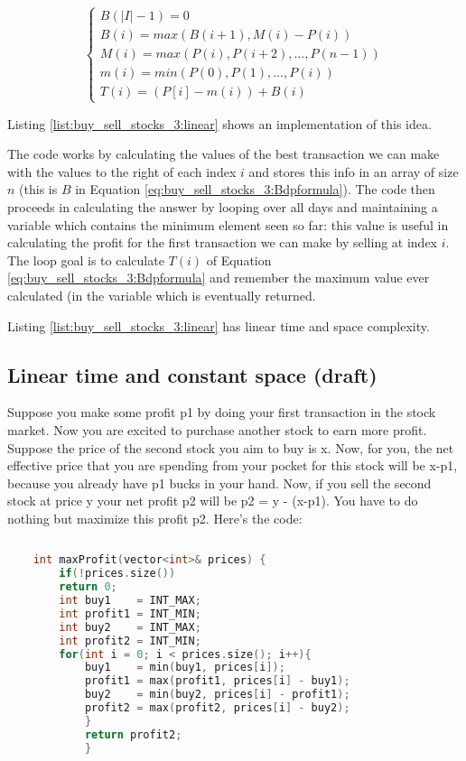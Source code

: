 \begin{equation}
    \begin{cases}
        B(|I|-1) = 0 \\
        B(i) = max(B(i+1), M(i)-P(i)) \\
		M(i) = max(P(i), P(i+2), \ldots, P(n-1)) \\
		m(i) = min(P(0), P(1), \ldots, P(i)) \\
		T(i) = (P[i]-m(i)) + B(i)
     \end{cases}
    \label{eq:buy_sell_stocks_3:Bdpformula}
\end{equation}

Listing \ref{list:buy_sell_stocks_3:linear} shows an implementation of this idea.



The code works by calculating the values of the best transaction we can make with the values to the right of each index $i$ and stores this info in an array of size $n$ (this is $B$ in Equation \ref{eq:buy_sell_stocks_3:Bdpformula}).
The code then proceeds in calculating the answer by looping over all days and maintaining a variable  which contains the minimum element seen so far: this value is useful in calculating the profit for the first transaction we can make by selling at index $i$.
The loop goal is to calculate $T(i)$ of Equation \ref{eq:buy_sell_stocks_3:Bdpformula} and remember the maximum value ever calculated (in the variable which is eventually returned.

Listing \ref{list:buy_sell_stocks_3:linear} has linear time and space complexity.


\subsection{Linear time and constant space (draft)}
Suppose you make some profit p1 by doing your first transaction in the stock market. Now you are excited to purchase another stock to earn more profit. Suppose the price of the second stock you aim to buy is x. Now, for you, the net effective price that you are spending from your pocket for this stock will be x-p1, because you already have p1 bucks in your hand. Now, if you sell the second stock at price y your net profit p2 will be p2 = y - (x-p1). You have to do nothing but maximize this profit p2. Here's the code:
\begin{lstlisting}[language=c++,numbers=none, caption={}]
	      
	int maxProfit(vector<int>& prices) {
		if(!prices.size())
		return 0;
        int buy1    = INT_MAX;
        int profit1 = INT_MIN;
        int buy2    = INT_MAX;
        int profit2 = INT_MIN;
        for(int i = 0; i < prices.size(); i++){
			buy1    = min(buy1, prices[i]);
            profit1 = max(profit1, prices[i] - buy1);
            buy2    = min(buy2, prices[i] - profit1);
            profit2 = max(profit2, prices[i] - buy2);
			}
			return profit2;
			}
		\end{lstlisting} 